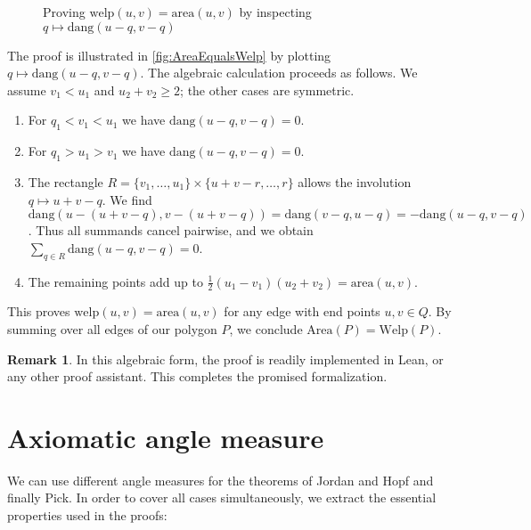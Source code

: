 \documentclass[a4paper]{amsart}
\numberwithin{equation}{section}
\theoremstyle{plain}
\theoremstyle{definition}
\newtheorem{remark}[theorem]{Remark}
\newcommand{\area}{\mathrm{area}}
\newcommand{\Area}{\mathrm{Area}}
\newcommand{\dang}{\mathrm{dang}}
\newcommand{\welp}{\mathrm{welp}}
\newcommand{\Welp}{\mathrm{Welp}}
\begin{document}
\begin{figure}[ht]
  \caption{Proving $\welp(u,v) = \area(u,v)$ by inspecting $q \mapsto \dang(u-q,v-q)$}
  \label{fig:AreaEqualsWelp}
\end{figure}


The proof is illustrated in \autoref{fig:AreaEqualsWelp}
by plotting $q \mapsto \dang(u-q,v-q)$.
The algebraic calculation proceeds as follows.
We assume $v_1 < u_1$ and $u_2 + v_2 \ge 2$;
the other cases are symmetric.
\begin{enumerate}
\item
  For $q_1 < v_1 < u_1$ we have $\dang(u-q,v-q) = 0$.
\item
  For $q_1 > u_1 > v_1$ we have $\dang(u-q,v-q) = 0$.
\item
  The rectangle $R = \{v_1,\ldots,u_1\} \times \{u+v-r,\ldots,r\}$
  allows the involution $q \mapsto u+v-q$.
  We find $\dang(u-(u+v-q), v-(u+v-q)) = \dang(v-q,u-q) = -\dang(u-q,v-q)$.
  Thus all summands cancel pairwise,
  and we obtain $\sum_{q \in R} \dang(u-q,v-q) = 0$.
\item
  The remaining points add up to $\frac{1}{2} (u_1-v_1) (u_2+v_2) = \area(u,v)$.
\end{enumerate}

This proves $\welp(u,v) = \area(u,v)$
for any edge with end points $u,v \in Q$.
By summing over all edges of our polygon $P$,
we conclude $\Area(P) = \Welp(P)$.


\begin{remark}
  In this algebraic form, the proof is readily implemented in Lean,
  or any other proof assistant.  This completes the promised formalization.
\end{remark}


\appendix

\setcounter{section}{0}
\section{Axiomatic angle measure}

We can use different angle measures for the theorems of
Jordan and Hopf and finally Pick.
In order to cover all cases simultaneously, 
we extract the essential properties used in the proofs:
\end{document}
